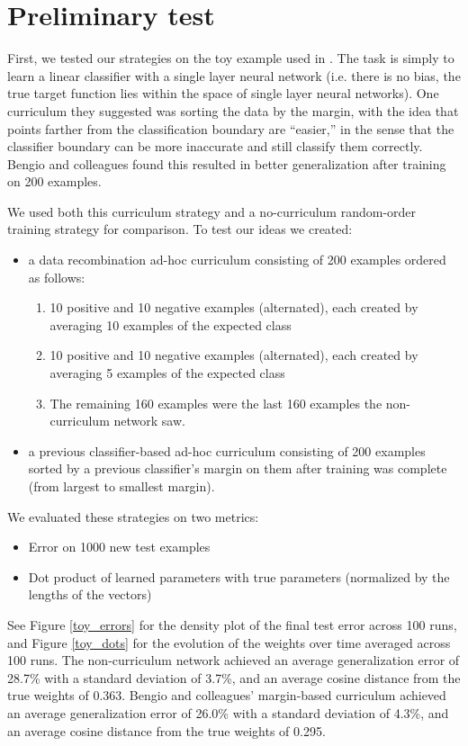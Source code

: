 \documentclass[11pt]{article}
\begin{document}
\section{Preliminary test}
First, we tested our strategies on the toy example used in \cite{Bengio2009}. The task is simply to learn a linear classifier with a single layer neural network (i.e. there is no bias, the true target function lies within the space of single layer neural networks). One curriculum they suggested was sorting the data by the margin, with the idea that points farther from the classification boundary are ``easier,'' in the sense that the classifier boundary can be more inaccurate and still classify them correctly. Bengio and colleagues found this resulted in better generalization after training on 200 examples. \par
We used both this curriculum strategy and a no-curriculum random-order training strategy for comparison. To test our ideas we created: 
\begin{itemize}
\item a data recombination ad-hoc curriculum consisting of 200 examples ordered as follows:
    \begin{enumerate}
    \item 10 positive and 10 negative examples (alternated), each created by averaging 10 examples of the expected class
    \item 10 positive and 10 negative examples (alternated), each created by averaging 5 examples of the expected class
    \item The remaining 160 examples were the last 160 examples the non-curriculum network saw. 
    \end{enumerate}
\item a previous classifier-based ad-hoc curriculum consisting of 200 examples sorted by a previous classifier's margin on them after training was complete (from largest to smallest margin). 
\end{itemize}
We evaluated these strategies on two metrics:
\begin{itemize}
\item Error on 1000 new test examples
\item Dot product of learned parameters with true parameters (normalized by the lengths of the vectors)
\end{itemize}
See Figure \ref{toy_errors} for the density plot of the final test error across 100 runs, and Figure \ref{toy_dots} for the evolution of the weights over time averaged across 100 runs. The non-curriculum network achieved an average generalization error of 28.7\% with a standard deviation of 3.7\%, and an average cosine distance from the true weights of 0.363. Bengio and colleagues' margin-based curriculum achieved an average generalization error of 26.0\% with a standard deviation of 4.3\%, and an average cosine distance from the true weights of 0.295. 
\end{document}
